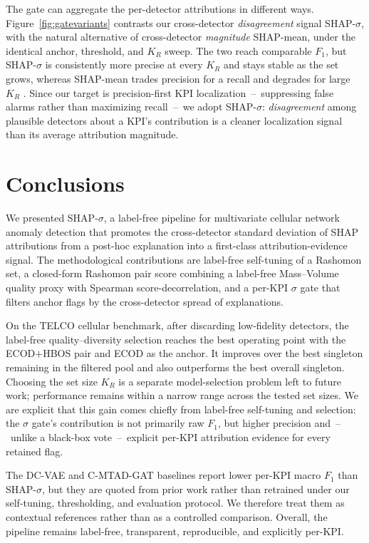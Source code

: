 \documentclass[conference]{IEEEtran}
\begin{document}
  The gate can aggregate the per-detector attributions in different ways.
  Figure~\ref{fig:gatevariants} contrasts our cross-detector
  \emph{disagreement} signal SHAP-$\sigma$,
  with the natural alternative of cross-detector \emph{magnitude}
  SHAP-mean, under the identical anchor,
  threshold, and $K_R$ sweep. The two reach comparable
  $F_1$, but SHAP-$\sigma$ is consistently more precise at every $K_R$
   and stays stable as the set
  grows, whereas SHAP-mean trades precision for a recall and
  degrades for large $K_R$ .
  Since our target is precision-first KPI localization~--~suppressing false
  alarms rather than maximizing recall~--~we adopt SHAP-$\sigma$:
  \emph{disagreement} among plausible detectors about a KPI's contribution
  is a cleaner localization signal than its average attribution magnitude.

\section{Conclusions}
\label{sec:conclusion}

We presented SHAP-$\sigma$, a label-free pipeline for multivariate
cellular network anomaly detection that promotes the cross-detector
standard deviation of SHAP attributions from a post-hoc explanation
into a first-class attribution-evidence signal. The methodological
contributions are label-free self-tuning of a Rashomon set, a closed-form
Rashomon pair score combining a label-free Mass--Volume quality proxy
with Spearman score-decorrelation, and a per-KPI $\sigma$ gate that
filters anchor flags by the cross-detector spread of explanations.

On the TELCO cellular benchmark, after discarding low-fidelity detectors,
the label-free quality--diversity selection reaches the best operating
point with the ECOD$+$HBOS pair and ECOD as the anchor. It improves over
the best singleton remaining in the filtered pool and also outperforms
the best overall singleton. Choosing the set size $K_R$ is a separate
model-selection problem left to future work; performance remains within
a narrow range across the tested set sizes. We are explicit that this
gain comes chiefly from label-free self-tuning and selection: the
$\sigma$ gate's contribution is not primarily raw $F_1$, but higher
precision and~--~unlike a black-box vote~--~explicit per-KPI attribution
evidence for every retained flag.

The DC-VAE and C-MTAD-GAT baselines report lower per-KPI macro $F_1$
than SHAP-$\sigma$, but they are quoted from prior work rather than
retrained under our self-tuning, thresholding, and evaluation protocol.
We therefore treat them as contextual references rather than as a
controlled comparison. Overall, the pipeline remains label-free,
transparent, reproducible, and explicitly per-KPI.
\end{document}
